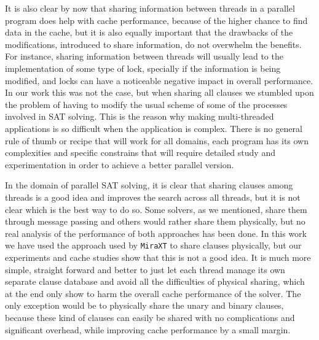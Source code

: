 \documentclass[12pt]{diicc}
\begin{document}
It is also clear by now that sharing information between threads in a parallel program does help with cache performance, because of the higher chance to find data in the cache, but it is also equally important that the drawbacks of the modifications, introduced to share information, do not overwhelm the benefits. For instance, sharing information between threads will usually lead to the implementation of some type of lock, specially if the information is being modified, and locks can have a noticeable negative impact in overall performance. In our work this was not the case, but when sharing all clauses we stumbled upon the problem of having to modify the usual scheme of some of the processes involved in SAT solving. This is the reason why making multi-threaded applications is so difficult when the application is complex. There is no general rule of thumb or recipe that will work for all domains, each program has its own complexities and specific constrains that will require detailed study and experimentation in order to achieve a better parallel version. 

In the domain of parallel SAT solving, it is clear that sharing clauses among threads is a good idea and improves the search across all threads, but it is not clear which is the best way to do so. Some solvers, as we mentioned, share them through message passing and others would rather share them physically, but no real analysis of the performance of both approaches has been done. In this work we have used the approach used by \texttt{MiraXT} to share clauses physically, but our experiments and cache studies show that this is not a good idea. It is much more simple, straight forward and better to just let each thread manage its own separate clause database and avoid all the difficulties of physical sharing, which at the end only show to harm the overall cache performance of the solver. The only exception would be to physically share the unary and binary clauses, because these kind of clauses can easily be shared with no complications and significant overhead, while improving cache performance by a small margin. 
\end{document}
